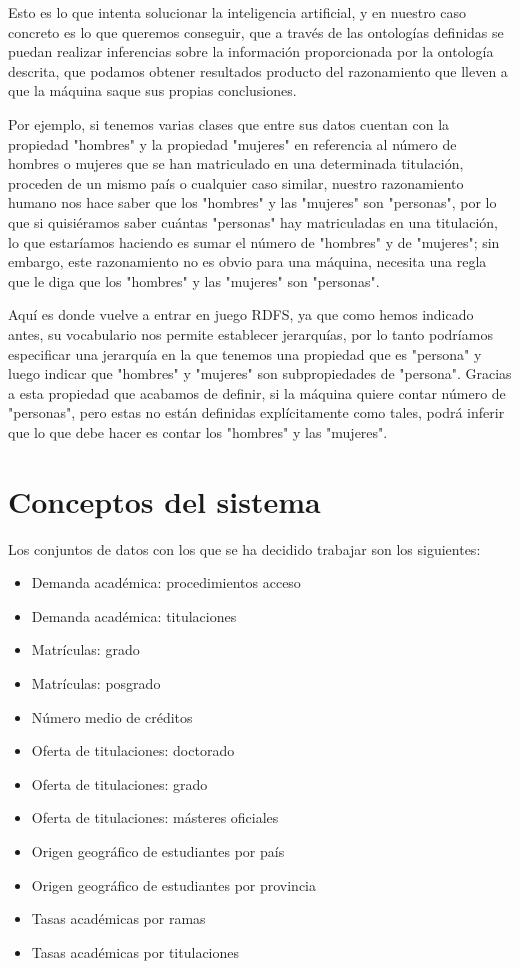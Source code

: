 \bigskip
Esto es lo que intenta solucionar la inteligencia artificial, y en nuestro caso concreto es lo que queremos conseguir, que a través de las ontologías definidas se puedan realizar inferencias sobre la información proporcionada por la ontología descrita, que podamos obtener resultados producto del razonamiento que lleven a que la máquina saque sus propias conclusiones.

\bigskip
Por ejemplo, si tenemos varias clases que entre sus datos cuentan con la propiedad "hombres" y la propiedad "mujeres" en referencia al número de hombres o mujeres que se han matriculado en una determinada titulación, proceden de un mismo país o cualquier caso similar, nuestro razonamiento humano nos hace saber que los "hombres" y las "mujeres" son "personas", por lo que si quisiéramos saber cuántas "personas" hay matriculadas en una titulación, lo que estaríamos haciendo es sumar el número de "hombres" y de "mujeres"; sin embargo, este razonamiento no es obvio para una máquina, necesita una regla que le diga que los "hombres" y las "mujeres" son "personas".

\bigskip
Aquí es donde vuelve a entrar en juego RDFS, ya que como hemos indicado antes, su vocabulario nos permite establecer jerarquías, por lo tanto podríamos especificar una jerarquía en la que tenemos una propiedad que es "persona" y luego indicar que "hombres" y "mujeres" son subpropiedades de "persona". Gracias a esta propiedad que acabamos de definir, si la máquina quiere contar número de "personas", pero estas no están definidas explícitamente como tales, podrá inferir que lo que debe hacer es contar los "hombres" y las "mujeres".

\section{Conceptos del sistema}

Los conjuntos de datos con los que se ha decidido trabajar son los siguientes:

\begin{itemize}
	\item Demanda académica: procedimientos acceso
	\item Demanda académica: titulaciones
	\item Matrículas: grado
	\item Matrículas: posgrado
	\item Número medio de créditos
	\item Oferta de titulaciones: doctorado
	\item Oferta de titulaciones: grado
	\item Oferta de titulaciones: másteres oficiales
	\item Origen geográfico de estudiantes por país
	\item Origen geográfico de estudiantes por provincia
	\item Tasas académicas por ramas
	\item Tasas académicas por titulaciones
\end{itemize}

